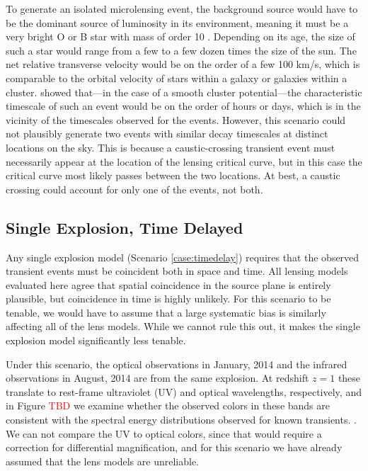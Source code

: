 To generate an isolated microlensing event, the background source
would have to be the dominant source of luminosity in its environment,
meaning it must be a very bright O or B star with mass of order 10
\Msun.  Depending on its age, the size of such a star would range from
a few to a few dozen times the size of the sun.  The net relative
transverse velocity would be on the order of a few 100 km/s, which is
comparable to the orbital velocity of stars within a galaxy or
galaxies within a cluster.  \citet{MiraldaEscude:1991} showed
that---in the case of a smooth cluster potential---the
%
%
%
characteristic timescale of such an event would be on the order of
hours or days, which is in the vicinity of the timescales observed for
the \spock events.  However, this scenario could not plausibly
generate two events with similar decay timescales at distinct
locations on the sky.  This is because a caustic-crossing transient
event must necessarily appear at the location of the lensing critical
curve, but in this case the critical curve most likely passes between
the two \spock locations. At best, a caustic crossing could account
for only one of the \spock events, not both.


\subsection{Single Explosion, Time Delayed}

Any single explosion model (Scenario \ref{case:timedelay}) requires
that the observed transient events must be coincident both in space
and time.  All lensing models evaluated here agree that spatial
coincidence in the source plane is entirely plausible, but coincidence
in time is highly unlikely. For this scenario to be tenable, we would
have to assume that a large systematic bias is similarly affecting all
of the lens models.  While we cannot rule this out, it makes the
single explosion model significantly less tenable.

Under this scenario, the optical observations in January, 2014 and the
infrared observations in August, 2014 are from the same explosion. At
redshift $z=1$ these translate to rest-frame ultraviolet (UV) and
optical wavelengths, respectively, and in Figure \textcolor{red}{TBD}
we examine whether the observed colors in these bands are consistent
with the spectral energy distributions observed for known transients.
.  We can not
compare the UV to optical colors, since that would require a
correction for differential magnification, and for this scenario we
have already assumed that the lens models are unreliable. 



